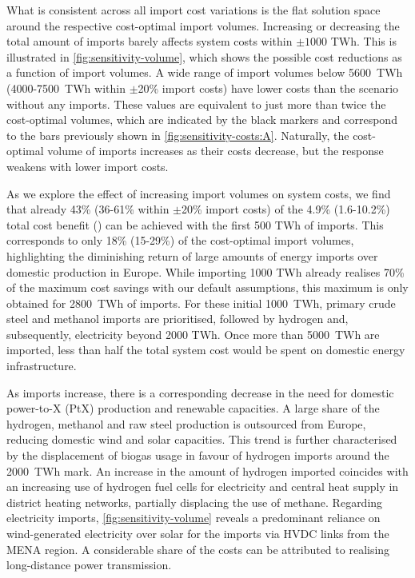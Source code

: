 What is consistent across all import cost variations is the flat solution space around the respective cost-optimal import volumes. Increasing or decreasing the total amount of imports barely affects system costs within $\pm 1000$ TWh. This is illustrated in \cref{fig:sensitivity-volume}, which shows the possible cost reductions as a function of import volumes. A wide range of import volumes below 5600~TWh (4000-7500~TWh within $\pm$20\% import costs) have lower costs than the scenario without any imports. These values are equivalent to just more than twice the cost-optimal volumes, which are indicated by the black markers and correspond to the bars previously shown in \cref{fig:sensitivity-costs:A}. Naturally, the cost-optimal volume of imports increases as their costs decrease, but the response weakens with lower import costs.

As we explore the effect of increasing import volumes on system costs, we find that already 43\% (36-61\% within $\pm$20\% import costs) of the 4.9\% (1.6-10.2\%) total cost benefit () can be achieved with the first 500 TWh of imports. This corresponds to only 18\% (15-29\%) of the cost-optimal import volumes, highlighting the diminishing return of large amounts of energy imports over domestic production in Europe. While importing 1000 TWh already realises 70\% of the maximum cost savings with our default assumptions, this maximum is only obtained for 2800~TWh of imports. For these initial 1000~TWh, primary crude steel and methanol imports are prioritised, followed by hydrogen and, subsequently, electricity beyond 2000 TWh. Once more than 5000~TWh are imported, less than half the total system cost would be spent on domestic energy infrastructure.

As imports increase, there is a corresponding decrease in the need for domestic power-to-X (PtX) production and renewable capacities. A large share of the hydrogen, methanol and raw steel production is outsourced from Europe, reducing domestic wind and solar capacities. This trend is further characterised by the displacement of biogas usage in favour of hydrogen imports around the 2000~TWh mark. An increase in the amount of hydrogen imported coincides with an increasing use of hydrogen fuel cells for electricity and central heat supply in district heating networks, partially displacing the use of methane. Regarding electricity imports, \cref{fig:sensitivity-volume} reveals a predominant reliance on wind-generated electricity over solar for the imports via HVDC links from the MENA region. A considerable share of the costs can be attributed to realising long-distance power transmission.

